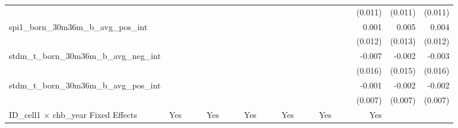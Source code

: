 \begin{tabular}{lrrrrrrrrrrrrrrrrrr}
                                            &              &              &              &              &              &              &              &              &               &              &              &               &              &              &               &      (0.011) &      (0.011) &       (0.011) \\ 
spi1\_born\_30m36m\_b\_avg\_pos\_int        &              &              &              &              &              &              &              &              &               &              &              &               &              &              &               &        0.001 &        0.005 &         0.004 \\ 
                                            &              &              &              &              &              &              &              &              &               &              &              &               &              &              &               &      (0.012) &      (0.013) &       (0.012) \\ 
stdm\_t\_born\_30m36m\_b\_avg\_neg\_int     &              &              &              &              &              &              &              &              &               &              &              &               &              &              &               &       -0.007 &       -0.002 &        -0.003 \\ 
                                            &              &              &              &              &              &              &              &              &               &              &              &               &              &              &               &      (0.016) &      (0.015) &       (0.016) \\ 
stdm\_t\_born\_30m36m\_b\_avg\_pos\_int     &              &              &              &              &              &              &              &              &               &              &              &               &              &              &               &       -0.001 &       -0.002 &        -0.002 \\ 
                                            &              &              &              &              &              &              &              &              &               &              &              &               &              &              &               &      (0.007) &      (0.007) &       (0.007) \\ 
\midrule
ID\_cell1 $\times$ chb\_year Fixed Effects  &          Yes &              &              &          Yes &              &              &          Yes &              &               &          Yes &              &               &          Yes &              &               &          Yes &              &               \\ 

\end{tabular}
